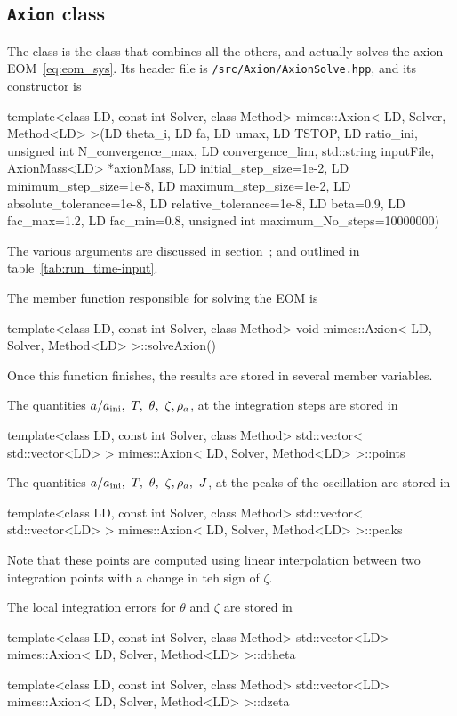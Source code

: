 \documentclass[11pt,a4paper]{article}
\begin{document}
\subsection{{\tt Axion} class}
%
The  class is the class that combines all the others, and actually solves the axion EOM~\ref{eq:eom_sys}. Its header file is {\tt \mimes/src/Axion/AxionSolve.hpp}, and its constructor is
%
\begin{cpp}
 	template<class LD, const int Solver, class Method>
	mimes::Axion< LD, Solver, Method<LD> >(LD theta_i, LD fa, LD umax, LD TSTOP, 
	LD ratio_ini, unsigned int N_convergence_max, LD convergence_lim, 
	std::string inputFile, AxionMass<LD> *axionMass, LD initial_step_size=1e-2, 
	LD minimum_step_size=1e-8, LD maximum_step_size=1e-2, LD absolute_tolerance=1e-8, 
	LD relative_tolerance=1e-8, LD beta=0.9, LD fac_max=1.2, LD fac_min=0.8, 
	unsigned int maximum_No_steps=10000000)
\end{cpp}
%
The various arguments are discussed in section~; and outlined in table~\ref{tab:run_time-input}.
%

The member function responsible for solving the EOM is
%
\begin{cpp}
	template<class LD, const int Solver, class Method>
	void mimes::Axion< LD, Solver, Method<LD> >::solveAxion()
\end{cpp}
%
Once this function finishes, the results are stored in several member variables.

The quantities $a/\ai, \ T, \ \theta, \ \zeta, \rho_a$, at the integration  steps are stored in
%
\begin{cpp}
	template<class LD, const int Solver, class Method> 
	std::vector< std::vector<LD> > mimes::Axion< LD, Solver, Method<LD> >::points
\end{cpp}
%

The quantities $a/\ai, \ T, \ \theta, \ \zeta, \rho_a, \ J$, at the peaks of the oscillation are stored in 
%
\begin{cpp}
	template<class LD, const int Solver, class Method> 
	std::vector< std::vector<LD> > mimes::Axion< LD, Solver, Method<LD> >::peaks
\end{cpp}
%
Note that these points are computed using linear interpolation between two integration points with a change in teh sign of $\zeta$.


The local integration errors for $\theta$ and $\zeta$ are stored in
%
\begin{cpp}
	template<class LD, const int Solver, class Method> 
	std::vector<LD> mimes::Axion< LD, Solver, Method<LD> >::dtheta
	
	template<class LD, const int Solver, class Method> 
	std::vector<LD> mimes::Axion< LD, Solver, Method<LD> >::dzeta
\end{cpp}
%
\end{document}
